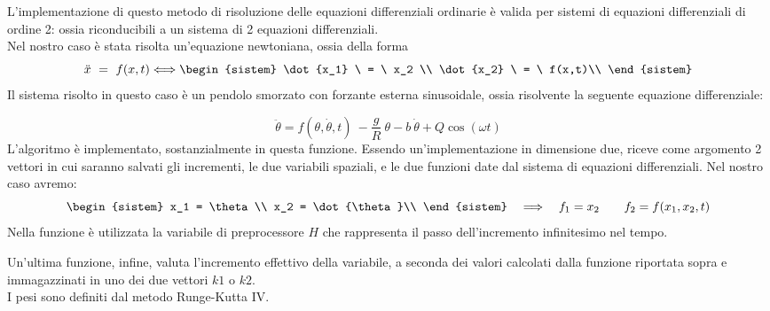 L'implementazione di questo metodo di risoluzione delle equazioni differenziali ordinarie è valida
per sistemi di equazioni differenziali di ordine 2: ossia riconducibili a un sistema di 2 equazioni differenziali.\\
Nel nostro caso è stata risolta un'equazione newtoniana, ossia della forma
$$
	\ddot{x} \ = \ f(x,t) \Longleftrightarrow  
	\begin{sistem}
	\dot{x_1} \ = \ x_2 \\
	\dot{x_2} \ = \ f(x,t)\\
	\end{sistem}
$$
Il sistema risolto in questo caso è un pendolo smorzato con forzante esterna sinusoidale, ossia
risolvente la seguente equazione differenziale:

$$
	\ddot{\theta} = f(\theta,\dot{\theta},t) \ - \frac{g}{R} \ \theta - b \ \dot{\theta} + Q \cos ( \omega t )
$$
L'algoritmo è implementato, sostanzialmente in questa funzione. Essendo un'implementazione in dimensione due, riceve come argomento 2 vettori in cui saranno salvati gli incrementi, le due variabili spaziali, e le due funzioni date dal sistema di equazioni differenziali.
Nel nostro caso avremo:
$$
	\begin{sistem}
	x_1 = \theta\\
	x_2 = \dot{\theta}\\
	\end{sistem}
	\quad \Longrightarrow \quad f_1 = x_2  \qquad f_2 = f(x_1,x_2,t)	
$$
Nella funzione è utilizzata la variabile di preprocessore $H$ che rappresenta il passo dell'incremento
infinitesimo nel tempo.

Un'ultima funzione, infine, valuta l'incremento effettivo della variabile, a seconda dei valori calcolati
dalla funzione riportata sopra e immagazzinati in uno dei due vettori $k1$ o $k2$.\\
I pesi sono definiti dal metodo Runge-Kutta IV.
